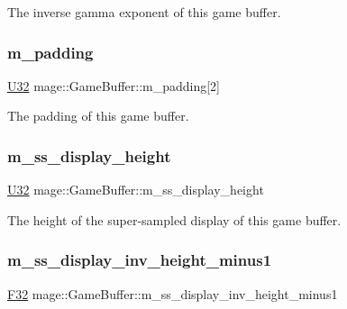 The inverse gamma exponent of this game buffer. \hypertarget{structmage_1_1_game_buffer_a6ab9b395e6cf4a6e120bb7ddf4be6913}{}\label{structmage_1_1_game_buffer_a6ab9b395e6cf4a6e120bb7ddf4be6913} 
\subsubsection{\texorpdfstring{m\+\_\+padding}{m\_padding}}
{\footnotesize\ttfamily \hyperlink{namespacemage_a41c104c036fba3756a74e19f793eeaa1}{U32} mage\+::\+Game\+Buffer\+::m\+\_\+padding\mbox{[}2\mbox{]}}

The padding of this game buffer. \hypertarget{structmage_1_1_game_buffer_a95b2766f3320627910ec153b512e5695}{}\label{structmage_1_1_game_buffer_a95b2766f3320627910ec153b512e5695} 
\subsubsection{\texorpdfstring{m\+\_\+ss\+\_\+display\+\_\+height}{m\_ss\_display\_height}}
{\footnotesize\ttfamily \hyperlink{namespacemage_a41c104c036fba3756a74e19f793eeaa1}{U32} mage\+::\+Game\+Buffer\+::m\+\_\+ss\+\_\+display\+\_\+height}

The height of the super-\/sampled display of this game buffer. \hypertarget{structmage_1_1_game_buffer_a28079651a44977c137e07c88de9caabc}{}\label{structmage_1_1_game_buffer_a28079651a44977c137e07c88de9caabc} 
\subsubsection{\texorpdfstring{m\+\_\+ss\+\_\+display\+\_\+inv\+\_\+height\+\_\+minus1}{m\_ss\_display\_inv\_height\_minus1}}
{\footnotesize\ttfamily \hyperlink{namespacemage_aa97e833b45f06d60a0a9c4fc22ae02c0}{F32} mage\+::\+Game\+Buffer\+::m\+\_\+ss\+\_\+display\+\_\+inv\+\_\+height\+\_\+minus1}

